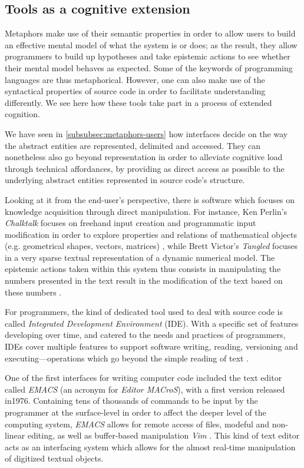 \subsection{Tools as a cognitive extension}
\label{subsec:tools-cognition}

Metaphors make use of their semantic properties in order to allow users to build an effective mental model of what the system is or does; as the result, they allow programmers to build up hypotheses and take epistemic actions to see whether their mental model behaves as expected. Some of the keywords of programming languages are thus metaphorical. However, one can also make use of the syntactical properties of source code in order to facilitate understanding differently. We see here how these tools take part in a process of extended cognition.

We have seen in \ref{subsubsec:metaphors-users} how interfaces decide on the way the abstract entities are represented, delimited and accessed. They can nonetheless also go beyond representation in order to alleviate cognitive load through technical affordances, by providing as direct access as possible to the underlying abstract entities represented in source code's structure.

Looking at it from the end-user's perspective, there is software which focuses on knowledge acquisition through direct manipulation. For instance, Ken Perlin's \emph{Chalktalk} focuses on freehand input creation and programmatic input modification in order to explore properties and relations of mathematical objects (e.g. geometrical shapes, vectors, matrices) \citep{perlin_chalktalk_2022}, while Brett Victor's \emph{Tangled} focuses in a very sparse textual representation of a dynamic numerical model. The epistemic actions taken within this system thus consists in manipulating the numbers presented in the text result in the modification of the text based on these numbers \citep{victor_tangle_2011,victor_explorable_2011}.

For programmers, the kind of dedicated tool used to deal with source code is called \emph{Integrated Development Environment} (IDE). With a specific set of features developing over time, and catered to the needs and practices of programmers, IDEs cover multiple features to support software writing, reading, versioning and executing—operations which go beyond the simple reading of text \citep{kline_evaluation_2005}.

One of the first interfaces for writing computer code included the text editor called \emph{EMACS} (an acronym for \emph{Editor MACroS}), with a first version released in1976. Containing tens of thousands of commands to be input by the programmer at the surface-level in order to affect the deeper level of the computing system, \emph{EMACS} allows for remote access of files, modeful and non-linear editing, as well as buffer-based manipulation \emph{Vim} \citep{greenberg_multics_1996}. This kind of text editor acts as an interfacing system which allows for the almost real-time manipulation of digitized textual objects.

